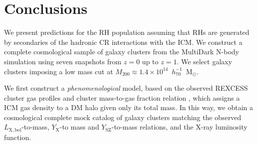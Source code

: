 \documentclass[traditabstract]{aa}
\newcommand{\rmn}{\mathrm}
\begin{document}



\section{Conclusions}
\label{sec:6}
We present predictions for the RH population assuming that RHs are generated by secondaries of the hadronic CR interactions with the ICM. We construct a complete cosmological sample of galaxy clusters from the MultiDark N-body simulation \citep{2011arXiv1104.5130P} using seven snapshots from $z = 0$ up to $z = 1$. We select galaxy clusters imposing a low mass cut at $M_{200}\approx1.4\times10^{14}$~$h_{70}^{-1}$~M$_{\odot}$. 

We first construct a \emph{phenomenological} model, based on the observed REXCESS cluster gas profiles \citep{2008A&A...487..431C} and cluster mass-to-gas fraction relation \citep{2009ApJ...693.1142S}, which assigns a ICM gas density to a DM halo given only its total mass. In this way, we obtain a cosmological complete mock catalog of galaxy clusters matching the observed $L_{\rmn{X, bol}}$-to-mass, $Y_{\rmn{X}}$-to mass and $Y_{\rmn{SZ}}$-to-mass relations, and the X-ray luminosity function.
\end{document}
